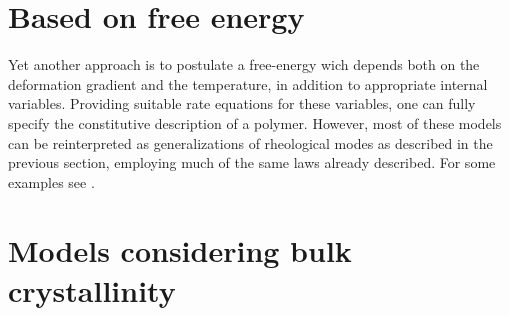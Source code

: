 \section{Based on free energy}

Yet another approach is to postulate a free-energy wich depends both on the deformation gradient and the temperature, in addition to appropriate internal variables.
Providing suitable rate equations for these variables, one can fully specify the constitutive description of a polymer.
However, most of these models can be reinterpreted as generalizations of rheological modes as described in the previous section, employing much of the same laws already described.
For some examples see \cite{anandTheoryAmorphousSolids2003, ghorbelViscoplasticConstitutiveModel2008,anandThermomechanicallyCoupledTheory2009, amesThermomechanicallyCoupledTheory2009, pouriayevaliConstitutiveDescriptionRatesensitive2013}.

\section{Models considering bulk crystallinity}
\label{sec:models_bulk_crystal}

